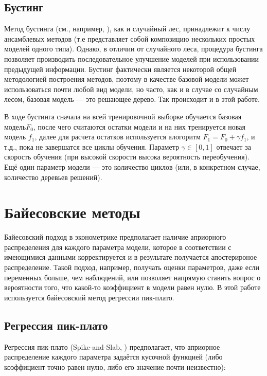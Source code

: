 \subsection{Бустинг}

Метод бустинга (см., например, \cite{freund1999short}), как и случайный лес, принадлежит к числу ансамблевых методов (т.е представляет собой композицию нескольких простых моделей одного типа). Однако, в отличии от случайного леса, процедура бустинга позволяет производить последовательное улучшение моделей при использовании предыдущей информации. Бустинг фактически является некоторой общей методологией построения методов, поэтому в качестве базовой модели может использоваться почти любой вид модели, но часто, как и в случае со случайным лесом, базовая модель --- это решающее дерево. Так происходит и в этой работе.

В ходе бустинга сначала на всей тренировочной выборке обучается базовая модель$F_0$, после чего считаются остатки модели и на них тренируется новая модель $f_1$, далее для расчета остатков используется алогоритм $F_1 = F_0+\gamma f_1$, и т.д., пока не завершатся все циклы обучения. Параметр $\gamma \in [0, 1]$ отвечает за скорость обучения (при высокой скорости высока вероятность переобучения). Ещё один параметр модели --- это количество циклов (или, в конкретном случае, количество деревьев решений).  

\section{Байесовские методы}
Байесовский подход в эконометрике предполагает наличие априорного распределения для каждого параметра модели, которое в соответствии с имеющимися данными корректируется и в результате получается апостерироное распределение.
Такой подход, например, получать оценки параметров, даже если переменных больше, чем наблюдений, или позволяет напрямую ставить вопрос о вероятности того, что какой-то коэффициент в модели равен нулю. В этой работе используется байесовский метод регрессии пик-плато.

\subsection{Регрессия пик-плато}
Регрессия пик-плато (Spike-and-Slab, \cite{ishwaran2005spike}) предполагает, что априорное распределение каждого параметра задаётся кусочной функцией (либо коэффициент точно равен нулю, либо его значение почти неизвестно):
    
